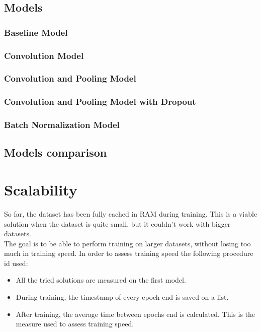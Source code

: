 \documentclass[a4paper,12pt]{article}
\begin{document}
\newcommand{\bat}{Batch Norm.(\texttt{BatchN.})}

\newpage

\subsection{Models}

\subsubsection{Baseline Model}


\subsubsection{Convolution Model}


\subsubsection{Convolution and Pooling Model}


\subsubsection{Convolution and Pooling Model with Dropout}


\subsubsection{Batch Normalization Model}


\subsection{Models comparison}





\newpage
\section{Scalability}
So far, the dataset has been fully cached in RAM during training. This is a viable solution when the dataset is quite small, but it couldn't work with bigger datasets.\\
The goal is to be able to perform training on larger datasets, without losing too much in training speed. In order to assess training speed the following procedure id used:
\begin{itemize}
\item All the tried solutions are measured on the first model.
\item During training, the timestamp of every epoch end is saved on a list.
\item After training, the average time between epochs end is calculated. This is the measure used to assess training speed.
\end{itemize}
\end{document}
